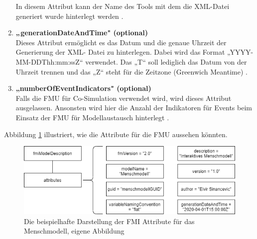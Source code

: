 \begin{enumerate}
	In diesem Attribut kann der Name des Tools mit dem die XML-Datei generiert wurde
	hinterlegt werden \cite[S.33]{25}.
	\item \textbf{„generationDateAndTime" (optional)} \cite[S.33]{25} \\
	Dieses Attribut ermöglicht es das Datum und die genaue Uhrzeit der Generierung der XML-
	Datei zu hinterlegen. Dabei wird das Format „YYYY-MM-DDThh:mm:ssZ“ verwendet. Das
	„T“ soll lediglich das Datum von der Uhrzeit trennen und das „Z“ steht für die Zeitzone
	(Greenwich Meantime) \cite[S.33]{25}.
	\item \textbf{„numberOfEventIndicators" (optional)} \cite[S.33]{25} \\
	Falls die FMU für Co-Simulation verwendet wird, wird dieses Attribut ausgelassen. Ansonsten
	wird hier die Anzahl der Indikatoren für Events beim Einsatz der FMU für Modellaustausch
	hinterlegt \cite[S.33]{25}.
\end{enumerate}
\noindent Abbildung \ref{fig:FMUAttribute} illustriert, wie die Attribute für die FMU aussehen könnten.
\begin{figure}[h]
	\centering
	\includegraphics[width=1\linewidth]{Bilder/A24_FMUAttributBeispiel}
	\caption{Die beispielhafte Darstellung der FMI Attribute für das Menschmodell, eigene Abbildung}
	\label{fig:FMUAttribute}
\end{figure}

